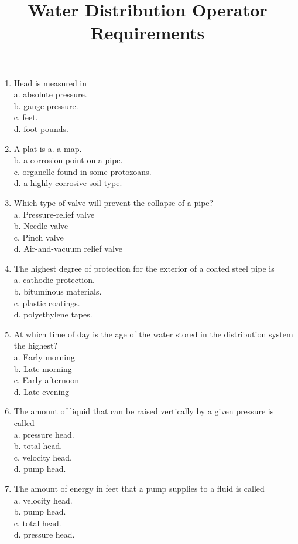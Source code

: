 \documentclass[10pt]{article}
\title{Water Distribution Operator Requirements }
\author{}
\date{}
\begin{document}
\begin{enumerate}
\item Head is measured in\\
a. absolute pressure.\\
b. gauge pressure.\\
c. feet.\\
d. foot-pounds.

\item A plat is
a. a map.\\
b. a corrosion point on a pipe.\\
c. organelle found in some protozoans.\\
d. a highly corrosive soil type.

\item Which type of valve will prevent the collapse of a pipe?\\
a. Pressure-relief valve\\
b. Needle valve\\
c. Pinch valve\\
d. Air-and-vacuum relief valve

  \item The highest degree of protection for the exterior of a coated steel pipe is\\
a. cathodic protection.\\
b. bituminous materials.\\
c. plastic coatings.\\
d. polyethylene tapes.

  \item At which time of day is the age of the water stored in the distribution system the highest?\\
a. Early morning\\
b. Late morning\\
c. Early afternoon\\
d. Late evening

  \item The amount of liquid that can be raised vertically by a given pressure is called\\
a. pressure head.\\
b. total head.\\
c. velocity head.\\
d. pump head.

  \item The amount of energy in feet that a pump supplies to a fluid is called\\
a. velocity head.\\
b. pump head.\\
c. total head.\\
d. pressure head.


\end{enumerate}
\end{document}
